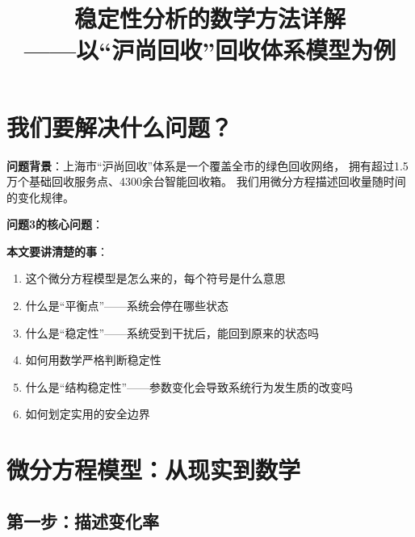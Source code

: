 \documentclass[12pt,a4paper]{article}
\title{\textbf{稳定性分析的数学方法详解}\\[5pt]
\large ——以``沪尚回收''回收体系模型为例}
\author{}
\date{}
\begin{document}
\maketitle

\section{我们要解决什么问题？}

\textbf{问题背景}：上海市``沪尚回收''体系是一个覆盖全市的绿色回收网络，
拥有超过1.5万个基础回收服务点、4300余台智能回收箱。
我们用微分方程描述回收量随时间的变化规律。

\textbf{问题3的核心问题}：
\begin{center}
\end{center}

\textbf{本文要讲清楚的事}：
\begin{enumerate}[label=(\arabic*)]
  \item 这个微分方程模型是怎么来的，每个符号是什么意思
  \item 什么是``平衡点''——系统会停在哪些状态
  \item 什么是``稳定性''——系统受到干扰后，能回到原来的状态吗
  \item 如何用数学严格判断稳定性
  \item 什么是``结构稳定性''——参数变化会导致系统行为发生质的改变吗
  \item 如何划定实用的安全边界
\end{enumerate}

\section{微分方程模型：从现实到数学}

\subsection{第一步：描述变化率}
\end{document}
